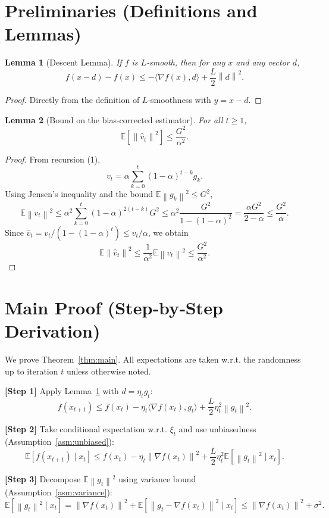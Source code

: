 \documentclass{article}
\newtheorem{lemma}{Lemma}
\newcommand{\E}{\mathbb{E}}
\newcommand{\norm}[1]{\left\lVert#1\right\rVert}
\begin{document}
\newpage
\section*{Preliminaries (Definitions and Lemmas)}
\begin{lemma}[Descent Lemma]\label{lem:descent}
If $f$ is $L$‑smooth, then for any $x$ and any vector $d$,
\[
f(x-d)-f(x)\le -\langle\nabla f(x),d\rangle+\frac{L}{2}\norm{d}^2 .
\]
\end{lemma}
\begin{proof}
Directly from the definition of $L$‑smoothness with $y=x-d$. \qedhere
\end{proof}

\begin{lemma}[Bound on the bias‑corrected estimator]\label{lem:estimator}
For all $t\ge 1$,
\[
\E\!\left[\norm{\hat v_t}^2\right]\le \frac{G^2}{\alpha^2}.
\]
\end{lemma}
\begin{proof}
From recursion (1),
\[
v_t = \alpha\sum_{k=0}^{t} (1-\alpha)^{t-k} g_k .
\]
Using Jensen’s inequality and the bound $\E\norm{g_k}^2\le G^2$,
\[
\E\norm{v_t}^2\le \alpha^2\sum_{k=0}^{t}(1-\alpha)^{2(t-k)} G^2
\le \alpha^2\frac{G^2}{1-(1-\alpha)^2}
= \frac{\alpha G^2}{2-\alpha}\le \frac{G^2}{\alpha}.
\]
Since $\hat v_t=v_t/(1-(1-\alpha)^t)\le v_t/\alpha$, we obtain
\[
\E\norm{\hat v_t}^2\le \frac{1}{\alpha^2}\E\norm{v_t}^2\le\frac{G^2}{\alpha^2}.
\]
\qedhere
\end{proof}

\section*{Main Proof (Step‑by‑Step Derivation)}
We prove Theorem~\ref{thm:main}.  
All expectations are taken w.r.t. the randomness up to iteration $t$ unless otherwise noted.

\noindent\textbf{[Step 1]} Apply Lemma~\ref{lem:descent} with $d=\eta_t g_t$:
\[
f(x_{t+1})\le f(x_t)-\eta_t\langle\nabla f(x_t),g_t\rangle+\frac{L}{2}\eta_t^{2}\norm{g_t}^{2}.
\tag{5}
\]

\noindent\textbf{[Step 2]} Take conditional expectation w.r.t. $\xi_t$ and use unbiasedness (Assumption~\ref{asm:unbiased}):
\[
\E\!\left[f(x_{t+1})\mid x_t\right]
\le f(x_t)-\eta_t\norm{\nabla f(x_t)}^{2}
+\frac{L}{2}\eta_t^{2}\E\!\left[\norm{g_t}^{2}\mid x_t\right].
\tag{6}
\]

\noindent\textbf{[Step 3]} Decompose $\E\norm{g_t}^{2}$ using variance bound (Assumption~\ref{asm:variance}):
\[
\E\!\left[\norm{g_t}^{2}\mid x_t\right]
= \norm{\nabla f(x_t)}^{2}+\E\!\left[\norm{g_t-\nabla f(x_t)}^{2}\mid x_t\right]
\le \norm{\nabla f(x_t)}^{2}+\sigma^{2}.
\tag{7}
\]
\end{document}
